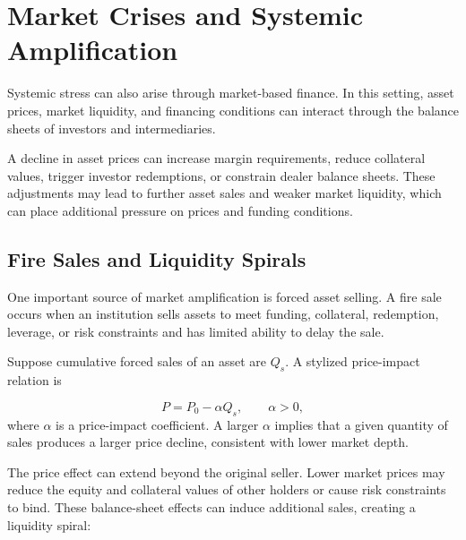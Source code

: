 \section{Market Crises and Systemic Amplification}

Systemic stress can also arise through market-based finance. In this setting, asset prices, market liquidity, and financing conditions can interact through the balance sheets of investors and intermediaries.

A decline in asset prices can increase margin requirements, reduce collateral values, trigger investor redemptions, or constrain dealer balance sheets. These adjustments may lead to further asset sales and weaker market liquidity, which can place additional pressure on prices and funding conditions.

\subsection{Fire Sales and Liquidity Spirals}

One important source of market amplification is forced asset selling. A fire sale occurs when an institution sells assets to meet funding, collateral, redemption, leverage, or risk constraints and has limited ability to delay the sale.

Suppose cumulative forced sales of an asset are \(Q_s\). A stylized price-impact relation is

\begin{equation}
P
=
P_0-\alpha Q_s,
\qquad
\alpha>0,
\label{eq:ch21-price-impact}
\end{equation}
where \(\alpha\) is a price-impact coefficient. A larger \(\alpha\) implies that a given quantity of sales produces a larger price decline, consistent with lower market depth.

The price effect can extend beyond the original seller. Lower market prices may reduce the equity and collateral values of other holders or cause risk constraints to bind. These balance-sheet effects can induce additional sales, creating a liquidity spiral:

